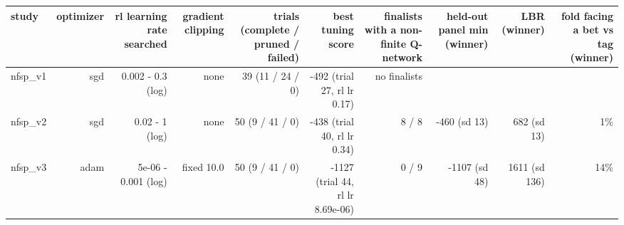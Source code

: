 \begin{tabular}{lrrrrrrrrr}
\toprule
study & optimizer & rl learning rate searched & gradient clipping & trials (complete / pruned / failed) & best tuning score & finalists with a non-finite Q-network & held-out panel min (winner) & LBR (winner) & fold facing a bet vs tag (winner) \\
\midrule
nfsp\_v1 & sgd & 0.002 - 0.3 (log) & none & 39 (11 / 24 / 0) & -492 (trial 27, rl lr 0.17) & no finalists &  &  &  \\
nfsp\_v2 & sgd & 0.02 - 1 (log) & none & 50 (9 / 41 / 0) & -438 (trial 40, rl lr 0.34) & 8 / 8 & -460 (sd 13) & 682 (sd 13) & 1\% \\
nfsp\_v3 & adam & 5e-06 - 0.001 (log) & fixed 10.0 & 50 (9 / 41 / 0) & -1127 (trial 44, rl lr 8.69e-06) & 0 / 9 & -1107 (sd 48) & 1611 (sd 136) & 14\% \\
\bottomrule
\end{tabular}
